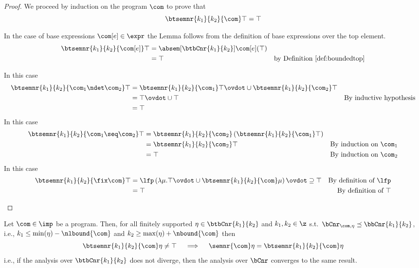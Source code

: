 \begin{proof}
  We proceed by induction on the program \(\com\) to prove that
  \begin{equation*}
    \btsemnr{k_1}{k_2}{\com}\top = \top
  \end{equation*}
  \begin{inductive}
    \case{\(\com[e]\)} In the case of base expressions
    \(\com[e]\in\expr\) the Lemma follows from the definition of
    base expressions over the top element.
    \begin{align*}
      \btsemnr{k_1}{k_2}{\com[e]}\top & = \absem[\btbCnr{k_1}{k_2}]{\com[e]}(\top) \\
                                      & = \top & \text{by Definition~\ref{def:boundedtop}}
    \end{align*}

     In this case
    \begin{align*}
      \btsemnr{k_1}{k_2}{\com_1\ndet\com_2}\top & = \btsemnr{k_1}{k_2}{\com_1}\top \ovdot\cup \btsemnr{k_1}{k_2}{\com_2}\top \\
                                                & = \top \ovdot\cup \top & \text{By inductive hypothesis} \\
                                                & = \top
    \end{align*}
     In this case
    \begin{align*}
      \btsemnr{k_1}{k_2}{\com_1\seq\com_2}\top & = \btsemnr{k_1}{k_2}{\com_2}\left(\btsemnr{k_1}{k_2}{\com_1}\top\right) \\
                                               & = \btsemnr{k_1}{k_2}{\com_2}\top & \text{By induction on }\com_1 \\
                                               & = \top & \text{By induction on }\com_2
    \end{align*}
    \case{\(\fix\com\)} In this case
    \begin{align*}
      \btsemnr{k_1}{k_2}{\fix\com}\top & = \lfp\left(\lambda \mu . \top \ovdot\cup \btsemnr{k_1}{k_2}{\com}\mu\right) \ovdot\supseteq \top & \text{By definition of }\lfp \\
                                       & = \top & \text{By definition of }\top
    \end{align*}
  \end{inductive}
\end{proof}

\begin{theorem}
  Let \(\com\in\imp\) be a program. Then, for all finitely supported
  \(\eta \in \btbCnr{k_1}{k_2}\) and \(k_1, k_2 \in \z\) s.t.\
  \(\bCnr_{\com,\eta} \preceq \bbCnr{k_1}{k_2}\), i.e.,
  \(k_1 \leq \min(\eta) - \nlbound{\com}\) and
  \(k_2 \geq \max(\eta) + \nbound{\com}\) then
  \begin{equation*}
    \btsemnr{k_1}{k_2}{\com}\eta \neq \top
    \quad
    \implies
    \quad
    \semnr{\com}\eta = \btsemnr{k_1}{k_2}{\com}\eta
  \end{equation*}
  i.e., if the analysis over \(\btbCnr{k_1}{k_2}\) does not diverge,
  then the analysis over \(\bCnr\) converges to the same result.
\end{theorem}

